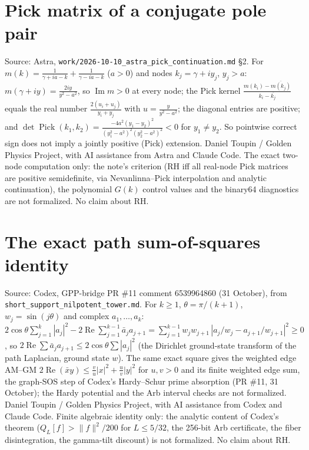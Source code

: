 \documentclass{report}
\theoremstyle{definition}
\begin{document}
\begin{itemize}
\begin{itemize}
\section{Pick matrix of a conjugate pole pair}
Source: Astra, \texttt{work/2026-10-10\_astra\_pick\_continuation.md} \S2. For $m(k)=\frac1{\gamma+ia-k}+\frac1{\gamma-ia-k}$ ($a>0$) and nodes $k_j=\gamma+iy_j$, $y_j>a$: $m(\gamma+iy)=\frac{2iy}{y^2-a^2}$, so $\operatorname{Im}m>0$ at every node;
the Pick kernel $\frac{m(k_i)-\overline{m(k_j)}}{k_i-\overline{k_j}}$ equals the real number $\frac{2(u_i+u_j)}{y_i+y_j}$ with $u=\frac{y}{y^2-a^2}$; the diagonal entries are positive; and
$\det\operatorname{Pick}(k_1,k_2)=\frac{-4a^2(y_1-y_2)^2}{(y_1^2-a^2)^2(y_2^2-a^2)^2}<0$ for $y_1\ne y_2$. So pointwise correct sign does not imply a jointly positive (Pick) extension.
Daniel Toupin / Golden Physics Project, with AI assistance from Astra and Claude Code. The exact two-node computation only: the note's criterion (RH iff all real-node Pick matrices are positive semidefinite, via Nevanlinna--Pick interpolation and analytic continuation), the polynomial $G(k)$ control values and the binary64 diagnostics are not formalized. No claim about RH.
\section{The exact path sum-of-squares identity}
Source: Codex, GPP-bridge PR \#11 comment 6539964860 (31 October), from \texttt{short\_support\_nilpotent\_tower.md}. For $k\ge1$, $\theta=\pi/(k+1)$, $w_j=\sin(j\theta)$ and complex $a_1,\dots,a_k$:
$2\cos\theta\sum_{j=1}^k|a_j|^2-2\operatorname{Re}\sum_{j=1}^{k-1}\bar a_ja_{j+1}=\sum_{j=1}^{k-1}w_jw_{j+1}\,|a_j/w_j-a_{j+1}/w_{j+1}|^2\ge0$, so $2\operatorname{Re}\sum\bar a_ja_{j+1}\le2\cos\theta\sum|a_j|^2$
(the Dirichlet ground-state transform of the path Laplacian, ground state $w$). The same exact square gives the weighted edge AM--GM $2\operatorname{Re}(\bar xy)\le\frac vu|x|^2+\frac uv|y|^2$ for $u,v>0$ and its finite weighted edge sum, the graph-SOS step of Codex's Hardy--Schur prime absorption (PR \#11, 31 October); the Hardy potential and the Arb interval checks are not formalized.
Daniel Toupin / Golden Physics Project, with AI assistance from Codex and Claude Code. Finite algebraic identity only: the analytic content of Codex's theorem ($Q_L[f]>\|f\|^2/200$ for $L\le5/32$, the 256-bit Arb certificate, the fiber disintegration, the gamma-tilt discount) is not formalized. No claim about RH.

\end{itemize}
\end{itemize}
\end{document}
